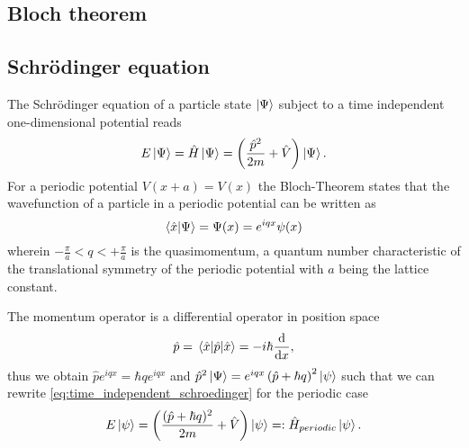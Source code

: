 \subsection{Bloch theorem}

\subsection{Schrödinger equation}

The Schrödinger equation of a particle state $\ket{\Psi}$ subject to a time
independent one-dimensional potential reads
\begin{align}
  E\ket{\Psi}
  =\hat{H}\ket{\Psi}
  =\left(\frac{\hat{p}^2}{2m}+\hat{V}\right)\ket{\Psi}
  \label{eq:time_independent_schroedinger}.
\end{align}
For a periodic potential $V(x+a)=V(x)$ the Bloch-Theorem \cite{Ashcroft1976}
states that the wavefunction of a particle in a periodic potential can be
written as
\begin{equation}
  \braket{\hat{x}}{\Psi}
  =\Psi(x)
  =e^{iqx}\psi(x)
  \label{eq:bloch_theorem}
\end{equation}
wherein $-\frac{\pi}{a}<q<+\frac{\pi}{a}$ is the quasimomentum, a quantum
number characteristic of the translational symmetry of the periodic potential
\cite[p. 42]{Lewenstein2012} with $a$ being the lattice constant.

The momentum operator is a differential operator in position space
\begin{equation}
  \hat{p}
  =\expval{\hat{p}}{\hat{x}}
  =-i\hbar\dv{x}
  \label{eq:momentum_operator_in_position_space},
\end{equation}
thus we obtain $\hat{p}e^{iqx}=\hbar qe^{iqx}$ and
$\hat{p}^2\ket{\Psi}=e^{iqx}\left(\hat{p}+\hbar q\right)^2\ket{\psi}$ such
that we can rewrite \cref{eq:time_independent_schroedinger} for
the periodic case
\begin{equation}
  E\ket{\psi}
  =\left(\frac{(\hat{p}+\hbar q)^2}{2m}+\hat{V}\right)\ket{\psi}
  =:\hat{H}_{periodic}\ket{\psi}
  \label{eq:periodic_schroedinger}.
\end{equation}

